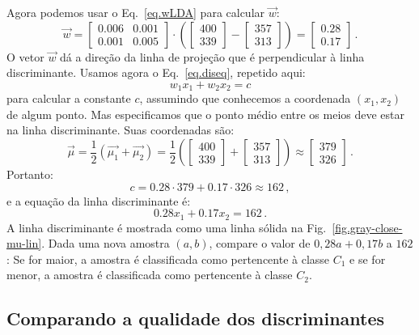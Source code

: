 Agora podemos usar o Eq.~\ref{eq.wLDA} para calcular $\vec{w}$:
\[
\vec{w} = \left[ \begin{array}{c} 0.006\\0.001\end{array} \begin{array}{c} 0.001\\0.005 \end{array}\right] \cdot \left( \left[ \begin{array}{c} 400\\339 \end{array}\right] - \left[ \begin{array}{c} 357\\313 \end{array} \right] \right) = \left[ \begin{array}{c} 0.28\\0.17 \end{array} \right]\,.
\]
O vetor $\vec{w}$ dá a direção da linha de projeção que é perpendicular à linha discriminante. Usamos agora o Eq.~\ref{eq.diseq}, repetido aqui:
\[
w_1x_1 + w_2x_2 = c
\]
para calcular a constante $c$, assumindo que conhecemos a coordenada $(x_1,x_2)$ de algum ponto. Mas especificamos que o ponto médio entre os meios deve estar na linha discriminante. Suas coordenadas são:
\[
\vec{\mu} = \frac{1}{2}(\vec{\mu_1} + \vec{\mu_2}) = \frac{1}{2}\left( \left[ \begin{array}{c} 400\\339 \end{array}\right] + \left[ \begin{array}{c} 357\\313 \end{array}\right] \right) \approx \left[ \begin{array}{c} 379\\326 \end{array}\right]\,.
\]
Portanto:
\[
c = 0.28 \cdot 379 + 0.17\cdot 326 \approx 162\,,
\]
e a equação da linha discriminante é:
\[
0.28 x_1 + 0.17 x_2 = 162\,.
\]
A linha discriminante é mostrada como uma linha sólida na Fig.~\ref{fig.gray-close-mu-lin}. Dada uma nova amostra $(a,b)$, compare o valor de $0,28a + 0,17b$ a $162$: Se for maior, a amostra é classificada como pertencente à classe $C_1$ e se for menor, a amostra é classificada como pertencente à classe $C_2$. 

\subsection{Comparando a qualidade dos discriminantes}

